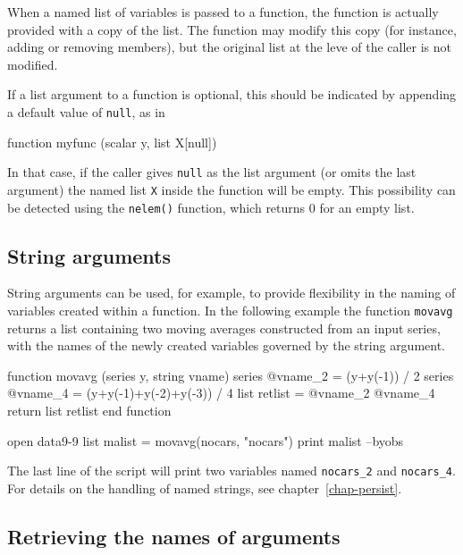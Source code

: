 When a named list of variables is passed to a function, the function
is actually provided with a copy of the list.  The function may modify
this copy (for instance, adding or removing members), but the original
list at the leve of the caller is not modified.

If a list argument to a function is optional, this should be indicated
by appending a default value of \texttt{null}, as in
%
\begin{code}
function myfunc (scalar y, list X[null])
\end{code}
%
In that case, if the caller gives \texttt{null} as the list argument
(or omits the last argument) the named list \texttt{X} inside the
function will be empty.  This possibility can be detected using the
\texttt{nelem()} function, which returns 0 for an empty list.

\subsection{String arguments}

String arguments can be used, for example, to provide flexibility in
the naming of variables created within a function.  In the following
example the function \texttt{movavg} returns a list containing two
moving averages constructed from an input series, with the names of
the newly created variables governed by the string argument.
%
\begin{code}
function movavg (series y, string vname)
   series @vname_2 = (y+y(-1)) / 2
   series @vname_4 = (y+y(-1)+y(-2)+y(-3)) / 4
   list retlist = @vname_2 @vname_4
   return list retlist
end function

open data9-9
list malist = movavg(nocars, "nocars")
print malist --byobs
\end{code}
%
The last line of the script will print two variables named
\verb|nocars_2| and \verb|nocars_4|.  For details on the handling of
named strings, see chapter~\ref{chap-persist}.


\subsection{Retrieving the names of arguments}

